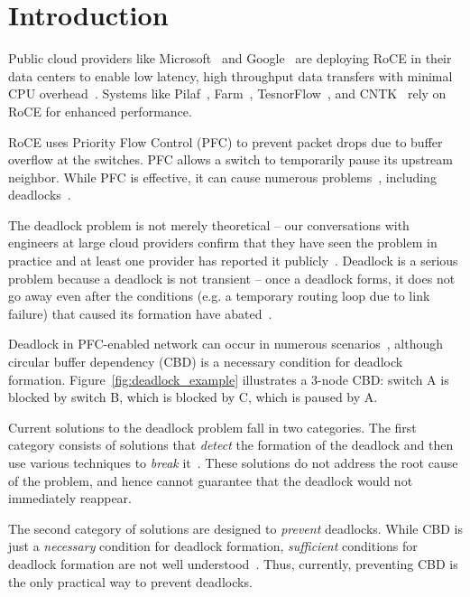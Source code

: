 \section{Introduction}
\label{sec:intro}

Public cloud providers like Microsoft~\cite{dcqcn} and Google~\cite{timely} are
deploying RoCE in their data centers to enable low latency, high throughput data
transfers with minimal CPU overhead~\cite{dcqcn}. Systems like
Pilaf~\cite{pilaf}, Farm~\cite{farm}, TesnorFlow~\cite{tensorflow}, and
CNTK~\cite{xxx} rely on RoCE for enhanced performance.

RoCE uses Priority Flow Control (PFC) to prevent packet drops due to buffer
overflow at the switches. PFC allows a switch to temporarily pause its upstream
neighbor. While PFC is effective, it can cause numerous problems~\cite{dcqcn},
including deadlocks~\cite{rdmaatscale,tcp-bolt,hu2016deadlocks}.

The deadlock problem is not merely theoretical -- our conversations with
engineers at large cloud providers confirm that they have seen the problem in
practice and at least one provider has reported it publicly~\cite{rdmaatscale}.
Deadlock is a serious problem because a deadlock is not transient -- once a
deadlock forms, it does not go away even after the conditions (e.g. a temporary
routing loop due to link failure) that caused its formation have
abated~\cite{rdmaatscale}.

Deadlock in PFC-enabled network can occur in numerous
scenarios~\cite{hu2016deadlocks}, although circular buffer dependency (CBD) is a
necessary condition for deadlock formation.  Figure~\ref{fig:deadlock_example}
illustrates a 3-node CBD: switch A is blocked by switch B, which is blocked by
C, which is paused by A. 

Current solutions to the deadlock problem fall in two categories. The first
category consists of solutions that {\em detect} the formation of the deadlock
and then use various techniques to {\em break} it~\cite{shpiner2016unlocking}.
These solutions do not address the root cause of the problem, and hence cannot
guarantee that the deadlock would not immediately reappear. 

The second category of solutions are designed to {\em prevent} deadlocks.  While
CBD is just a {\em necessary} condition for deadlock formation, {\em sufficient}
conditions for deadlock formation are not well
understood~\cite{hu2016deadlocks}. Thus, currently, preventing CBD is the only
practical way to prevent deadlocks. 

